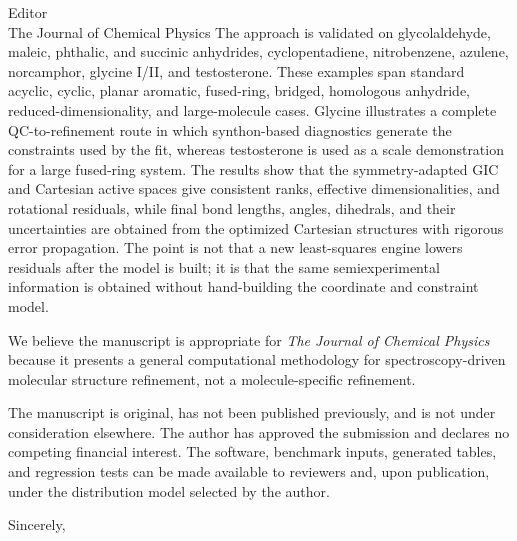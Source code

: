 \documentclass[11pt]{letter}
\begin{document}
\begin{letter}{Editor\\
The Journal of Chemical Physics}
The approach is validated on glycolaldehyde, maleic, phthalic, and succinic
anhydrides, cyclopentadiene, nitrobenzene, azulene, norcamphor, glycine I/II,
and testosterone. These examples span standard acyclic, cyclic, planar
aromatic, fused-ring, bridged, homologous anhydride, reduced-dimensionality,
and large-molecule cases. Glycine illustrates a complete QC-to-refinement route in
which synthon-based diagnostics generate the constraints used by the fit,
whereas testosterone is used as a scale demonstration for a large fused-ring
system. The results show that the
symmetry-adapted GIC and Cartesian active spaces give consistent ranks,
effective dimensionalities, and rotational residuals, while final bond lengths,
angles, dihedrals, and their uncertainties are obtained from the optimized
Cartesian structures with rigorous error propagation. The point is not that a
new least-squares engine lowers residuals after the model is built; it is that
the same semiexperimental information is obtained without hand-building the
coordinate and constraint model.

We believe the manuscript is appropriate for \emph{The Journal of Chemical
Physics} because it presents a general computational methodology for
spectroscopy-driven molecular structure refinement, not a molecule-specific
refinement.

The manuscript is original, has not been published previously, and is not under
consideration elsewhere. The author has approved the submission and declares no
competing financial interest. The software, benchmark inputs, generated tables,
and regression tests can be made available to reviewers and, upon publication,
under the distribution model selected by the author.

\closing{Sincerely,}

\end{letter}
\end{document}
